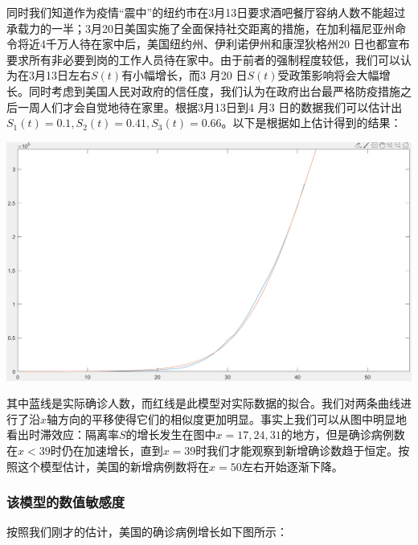 \documentclass[UTF8]{ctexart}
\begin{document}
			同时我们知道作为疫情“震中”的纽约市在3月13日要求酒吧餐厅容纳人数不能超过承载力的一半；3月20日美国实施了全面保持社交距离的措施，在加利福尼亚州命令将近4千万人待在家中后，美国纽约州、伊利诺伊州和康涅狄格州20 日也都宣布要求所有非必要到岗的工作人员待在家中。由于前者的强制程度较低，我们可以认为在3月13日左右$S(t)$有小幅增长，而3 月20 日$S (t)$受政策影响将会大幅增长。同时考虑到美国人民对政府的信任度，我们认为在政府出台最严格防疫措施之后一周人们才会自觉地待在家里。根据3月13日到4 月3 日的数据我们可以估计出$ S_1(t)=0.1,S_2(t)=0.41,S_3(t)=0.66$。以下是根据如上估计得到的结果：
			

				\centerline{\includegraphics[scale=0.13]{3.png}}
				

			
			其中蓝线是实际确诊人数，而红线是此模型对实际数据的拟合。我们对两条曲线进行了沿$x$轴方向的平移使得它们的相似度更加明显。事实上我们可以从图中明显地看出时滞效应：隔离率$S$的增长发生在图中$x=17,24,31$的地方，但是确诊病例数在$x<39$时仍在加速增长，直到$x=39$时我们才能观察到新增确诊数趋于恒定。按照这个模型估计，美国的新增病例数将在$x=50$左右开始逐渐下降。
	
			\subsubsection{该模型的数值敏感度}
				按照我们刚才的估计，美国的确诊病例增长如下图所示：
				
\end{document}
